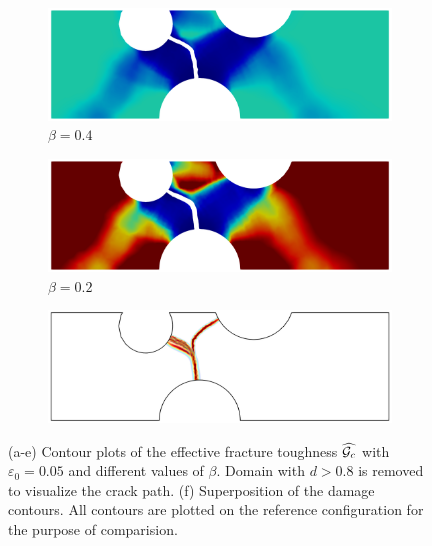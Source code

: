 \begin{figure}[!htb]
  \begin{subfigure}[b]{0.3\textwidth}
    \centering
    \includegraphics[width=\textwidth,scale=0.5]{Chapter5/figures/3pb/beta_0.4}
    \caption{$\beta=0.4$}
  \end{subfigure}
  \begin{subfigure}[b]{0.3\textwidth}
    \centering
    \includegraphics[width=\textwidth,scale=0.5]{Chapter5/figures/3pb/beta_0.2}
    \caption{$\beta=0.2$}
  \end{subfigure}
  \begin{subfigure}[b]{0.3\textwidth}
    \centering
    \includegraphics[width=\textwidth,scale=0.5]{Chapter5/figures/3pb/compare_e0_constant}
    \caption{}
  \end{subfigure}
  \caption[Comparison of crack paths for different values of $\beta$.]{(a-e) Contour plots of the effective fracture toughness $\widehat{{\mathcal{G}_c}}$ with $\varepsilon_0=0.05$ and different values of $\beta$. Domain with $d > 0.8$ is removed to visualize the crack path. (f) Superposition of the damage contours. All contours are plotted on the reference configuration for the purpose of comparision.}
  \label{fig: Chapter5/3pb/2D_comparison_constant_e0}
\end{figure}
